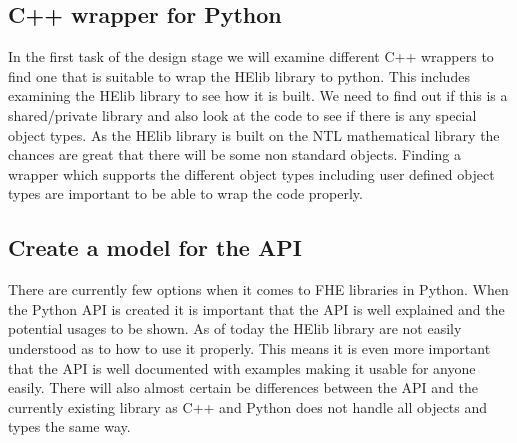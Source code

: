\subsection{C++ wrapper for Python}
In the first task of the design stage we will examine different C++ wrappers to find one that is suitable to wrap the HElib library to python. This includes examining the HElib library to see how it is built. We need to find out if this is a shared/private library and also look at the code to see if there is any special object types. As the HElib library is built on the NTL mathematical library the chances are great that there will be some non standard objects. Finding a wrapper which supports the different object types including user defined object types are important to be able to wrap the code properly.

\subsection{Create a model for the API}
There are currently few options when it comes to FHE libraries in Python. When the Python API is created it is important that the API is well explained and the potential usages to be shown. As of today the HElib library are not easily understood as to how to use it properly. This means it is even more important that the API is well documented with examples making it usable for anyone easily. There will also almost certain be differences between the API and the currently existing library as C++ and Python does not handle all objects and types the same way.  
